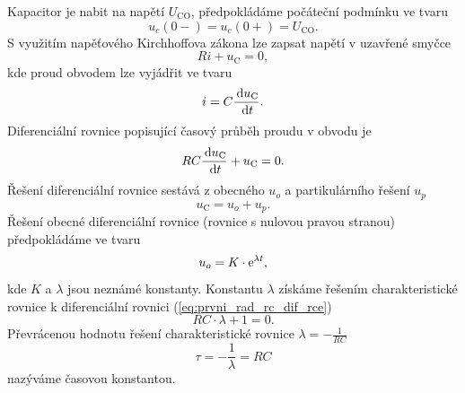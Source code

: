 Kapacitor je nabit na napětí $U_\mathrm{CO}$, předpokládáme počáteční podmínku ve tvaru
$$
u_c(0-) = u_c(0+) = U_\mathrm{CO}.
$$
S využitím napěťového Kirchhoffova zákona lze zapsat napětí v uzavřené smyčce 
$$
Ri + u_\mathrm{C} = 0,
$$
kde proud obvodem lze vyjádřit ve tvaru 
$$
i = C \frac{\,\mathrm{d} u_\mathrm{C}}{\,\mathrm{d} t}.
$$
Diferenciální rovnice popisující časový průběh proudu v obvodu je
\begin{equation}
RC \frac{\,\mathrm{d} u_\mathrm{C}}{\,\mathrm{d} t} + u_\mathrm{C} = 0.
\label{eq:prvni_rad_rc_dif_rce}
\end{equation}
Řešení diferenciální rovnice sestává z obecného $u_o$ a partikulárního řešení $u_p$
$$
u_\mathrm{C} = u_o + u_p.
$$
Řešení obecné diferenciální rovnice (rovnice s nulovou pravou stranou) předpokládáme ve tvaru
$$
u_o = K \cdot \mathrm{e}^{\lambda t},
$$
kde $K$ a $\lambda$ jsou neznámé konstanty. Konstantu $\lambda$ získáme řešením charakteristické rovnice k diferenciální rovnici (\ref{eq:prvni_rad_rc_dif_rce})
$$
RC \cdot \lambda + 1 = 0.
$$
Převrácenou hodnotu řešení charakteristické rovnice $\lambda = - \frac{1}{RC}$
$$
\tau = - \frac{1}{\lambda} = RC
$$ 
nazýváme časovou konstantou. 

